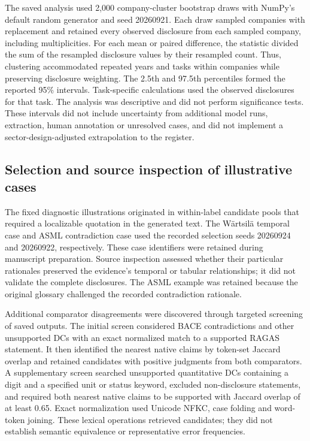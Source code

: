 \documentclass[11pt,a4paper]{article}
\begin{document}
The saved analysis used 2,000 company-cluster bootstrap draws with NumPy's default random generator and seed 20260921. Each draw sampled companies with replacement and retained every observed disclosure from each sampled company, including multiplicities. For each mean or paired difference, the statistic divided the sum of the resampled disclosure values by their resampled count. Thus, clustering accommodated repeated years and tasks within companies while preserving disclosure weighting. The 2.5th and 97.5th percentiles formed the reported 95\% intervals. Task-specific calculations used the observed disclosures for that task. The analysis was descriptive and did not perform significance tests. These intervals did not include uncertainty from additional model runs, extraction, human annotation or unresolved cases, and did not implement a sector-design-adjusted extrapolation to the register.

\subsection*{Selection and source inspection of illustrative cases}

The fixed diagnostic illustrations originated in within-label candidate pools that required a localizable quotation in the generated text. The Wärtsilä temporal case and ASML contradiction case used the recorded selection seeds 20260924 and 20260922, respectively. These case identifiers were retained during manuscript preparation. Source inspection assessed whether their particular rationales preserved the evidence's temporal or tabular relationships; it did not validate the complete disclosures. The ASML example was retained because the original glossary challenged the recorded contradiction rationale.

Additional comparator disagreements were discovered through targeted screening of saved outputs. The initial screen considered BACE contradictions and other unsupported DCs with an exact normalized match to a supported RAGAS statement. It then identified the nearest native claims by token-set Jaccard overlap and retained candidates with positive judgments from both comparators. A supplementary screen searched unsupported quantitative DCs containing a digit and a specified unit or status keyword, excluded non-disclosure statements, and required both nearest native claims to be supported with Jaccard overlap of at least 0.65. Exact normalization used Unicode NFKC, case folding and word-token joining. These lexical operations retrieved candidates; they did not establish semantic equivalence or representative error frequencies.
\end{document}
